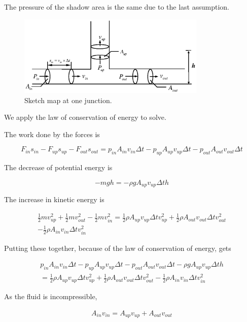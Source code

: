 \documentclass[12pt,a4paper,titlepage]{article}
\begin{document}
The pressure of the shadow area is the same due to the last
assumption.

\begin{figure}[!htb]

\centering
\includegraphics[width=0.8\textwidth]{fig02.eps}
\caption{\label{fig02} Sketch map at one junction.}
\end{figure}

We apply the law of conservation of energy to solve.

The work done by the forces is

\[
F_{in}s_{in}-F_{up}s_{up}-F_{out}s_{out}=p_{in}A_{in}v_{in}\Delta
t-p_{up}A_{up}v_{up}\Delta t-p_{out}A_{out}v_{out}\Delta t
\]

The decrease of potential energy is

\[
-mgh=-\rho gA_{up}v_{up}\Delta th
\]

The increase in kinetic energy is


\begin{eqnarray}
\frac{1}{2}mv_{up}^2+\frac{1}{2}mv_{out}^2-\frac{1}{2}mv_{in}^2=\frac{1}{2}\rho
A_{up}v_{up}\Delta tv_{up}^2+\frac{1}{2}\rho A_{out}v_{out}\Delta
tv_{out}^2\nonumber\\-\frac{1}{2}\rho A_{in}v_{in}\Delta
tv_{in}^2\nonumber
\end{eqnarray}

Putting these together, because of the law of conservation of
energy, gets

\begin{eqnarray}
p_{in}A_{in}v_{in}\Delta t-p_{up}A_{up}v_{up}\Delta
t-p_{out}A_{out}v_{out}\Delta t-\rho gA_{up}v_{up}\Delta th
\nonumber\\=\frac{1}{2}\rho A_{up}v_{up}\Delta
tv_{up}^2+\frac{1}{2}\rho A_{out}v_{out}\Delta
tv_{out}^2-\frac{1}{2}\rho A_{in}v_{in}\Delta tv_{in}^2
\end{eqnarray}

As the fluid is incompressible,

\begin{eqnarray}
A_{in}v_{in}=A_{up}v_{up}+A_{out}v_{out}
\end{eqnarray}
\end{document}
